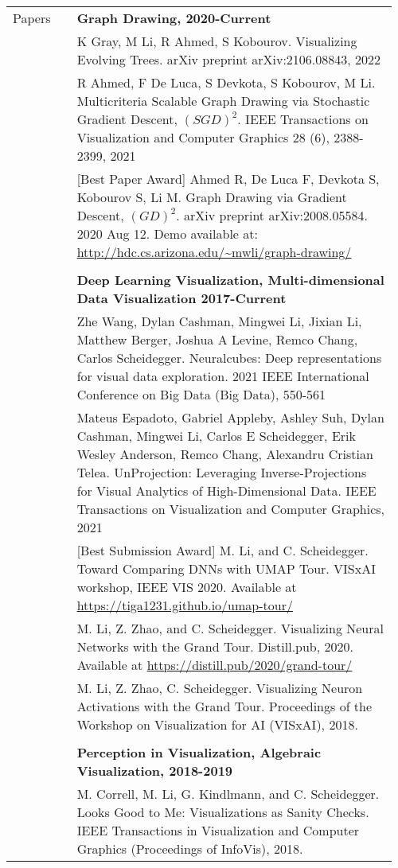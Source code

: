 \documentclass[letterpaper,11pt,oneside]{article}
\begin{document}
\noindent \begin{tabular}{p{0.16\linewidth} p{0.8\linewidth}}
\Large{Papers}
    & \textbf{Graph Drawing, 2020-Current} \\

    & K Gray, M Li, R Ahmed, S Kobourov. Visualizing Evolving Trees. arXiv preprint arXiv:2106.08843, 2022\\
    & R Ahmed, F De Luca, S Devkota, S Kobourov, M Li. Multicriteria Scalable Graph Drawing via Stochastic Gradient Descent, $(SGD)^2$. IEEE Transactions on Visualization and Computer Graphics 28 (6), 2388-2399, 2021\\
    & [Best Paper Award] Ahmed R, De Luca F, Devkota S, Kobourov S, Li M. Graph Drawing via Gradient Descent, $(GD)^2$. arXiv preprint arXiv:2008.05584. 2020 Aug 12. Demo available at: \url{http://hdc.cs.arizona.edu/~mwli/graph-drawing/}\\
    
    & \\
    & \textbf{Deep Learning Visualization, Multi-dimensional Data Visualization 2017-Current} \\

    & Zhe Wang, Dylan Cashman, Mingwei Li, Jixian Li, Matthew Berger, Joshua A Levine, Remco Chang, Carlos Scheidegger. Neuralcubes: Deep representations for visual data exploration. 2021 IEEE International Conference on Big Data (Big Data), 550-561 \\
    & Mateus Espadoto, Gabriel Appleby, Ashley Suh, Dylan Cashman, Mingwei Li, Carlos E Scheidegger, Erik Wesley Anderson, Remco Chang, Alexandru Cristian Telea. UnProjection: Leveraging Inverse-Projections for Visual Analytics of High-Dimensional Data. IEEE Transactions on Visualization and Computer Graphics, 2021\\

    & [Best Submission Award] M. Li, and C. Scheidegger. Toward Comparing DNNs with UMAP Tour. VISxAI workshop, IEEE VIS 2020. Available at \url{https://tiga1231.github.io/umap-tour/}\\

    & M. Li, Z. Zhao, and C. Scheidegger. Visualizing Neural Networks with the Grand Tour. Distill.pub, 2020. Available at \url{https://distill.pub/2020/grand-tour/}\\

    & M. Li, Z. Zhao, C. Scheidegger. Visualizing Neuron Activations with the Grand Tour. Proceedings of the Workshop on Visualization for AI (VISxAI), 2018. \\

    & \\
    & \textbf{Perception in Visualization, Algebraic Visualization, 2018-2019} \\
    & M. Correll, M. Li, G. Kindlmann, and C. Scheidegger. Looks Good to Me: Visualizations as Sanity Checks. IEEE Transactions in Visualization and Computer Graphics (Proceedings of InfoVis), 2018. \\

\end{tabular}
\end{document}
